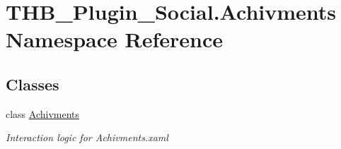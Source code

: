 \hypertarget{namespace_t_h_b___plugin___social_1_1_achivments}{}\section{T\+H\+B\+\_\+\+Plugin\+\_\+\+Social.\+Achivments Namespace Reference}
\label{namespace_t_h_b___plugin___social_1_1_achivments}
\subsection*{Classes}
\begin{DoxyCompactItemize}
\item 
class \mbox{\hyperlink{class_t_h_b___plugin___social_1_1_achivments_1_1_achivments}{Achivments}}
\begin{DoxyCompactList}\small\item\em Interaction logic for Achivments.\+xaml \end{DoxyCompactList}\end{DoxyCompactItemize}
